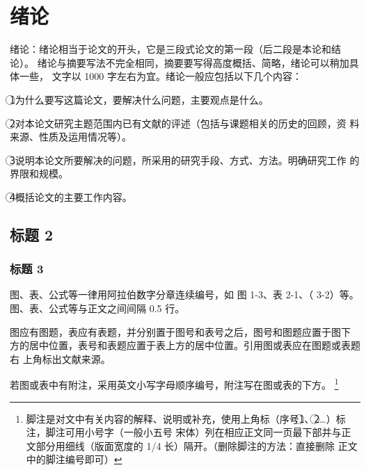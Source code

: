 \documentclass[60pt]{template}
\begin{document}
 

\section{绪论}
绪论：绪论相当于论文的开头，它是三段式论文的第一段（后二段是本论和结论）。 绪论与摘要写法不完全相同，摘要要写得高度概括、简略，绪论可以稍加具体一些， 文字以 1000 字左右为宜。绪论一般应包括以下几个内容：

\textcircled{1}为什么要写这篇论文，要解决什么问题，主要观点是什么。

\textcircled{2}对本论文研究主题范围内已有文献的评述（包括与课题相关的历史的回顾，资 料来源、性质及运用情况等）。 

\textcircled{3}说明本论文所要解决的问题，所采用的研究手段、方式、方法。明确研究工作 的界限和规模。 

\textcircled{4}概括论文的主要工作内容。  

\subsection{标题 2}
\subsubsection{标题 3}
图、表、公式等一律用阿拉伯数字分章连续编号，如 图 1-3、表 2-1、（ 3-2）等。 图、表、公式等与正文之间间隔 0.5 行。 

图应有图题，表应有表题，并分别置于图号和表号之后，图号和图题应置于图下 方的居中位置，表号和表题应置于表上方的居中位置。引用图或表应在图题或表题右 上角标出文献来源。 

若图或表中有附注，采用英文小写字母顺序编号，附注写在图或表的下方。 \footnote{脚注是对文中有关内容的解释、说明或补充，使用上角标（序号\textcircled{1}、\textcircled{2}…）标注，脚注可用小号字（一般小五号 宋体）列在相应正文同一页最下部并与正文部分用细线（版面宽度的 1/4 长）隔开。（删除脚注的方法：直接删除 正文中的脚注编号即可） }
\end{document}
